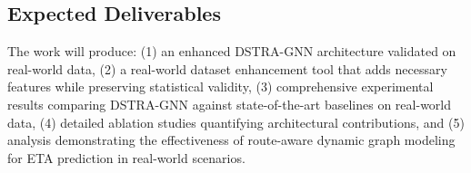 \subsection{Expected Deliverables}

The work will produce: (1) an enhanced DSTRA-GNN architecture validated on real-world data, (2) a real-world dataset enhancement tool that adds necessary features while preserving statistical validity, (3) comprehensive experimental results comparing DSTRA-GNN against state-of-the-art baselines on real-world data, (4) detailed ablation studies quantifying architectural contributions, and (5) analysis demonstrating the effectiveness of route-aware dynamic graph modeling for ETA prediction in real-world scenarios.
